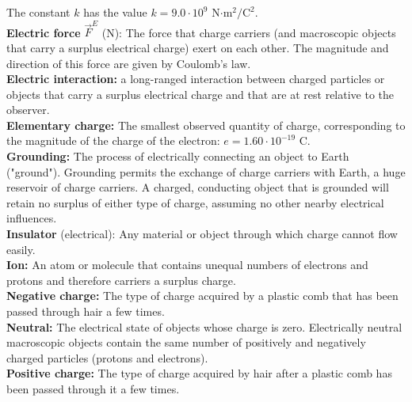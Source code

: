         The constant $k$ has the value $k=9.0\cdot 10^9$ N$\cdot\text{m}^2/\text{C}^2$. \\
        \textbf{Electric force} $\vec{F}^E$ (N): The force that charge carriers (and macroscopic objects that carry a surplus electrical charge) exert on each other. The magnitude and direction of this force are given
        by Coulomb's law. \\
        \textbf{Electric interaction:} a long-ranged interaction between charged particles or objects that carry a surplus electrical charge and that are at rest relative to the observer. \\
        \textbf{Elementary charge:} The smallest observed quantity of charge, corresponding to the magnitude of the charge of the electron: $e = 1.60\cdot 10^{-19}$ C. \\
        \textbf{Grounding:} The process of electrically connecting an object to Earth ("ground"). Grounding permits the exchange of charge carriers with Earth, a huge reservoir of charge carriers. A charged, conducting
        object that is grounded will retain no surplus of either type of charge, assuming no other nearby electrical influences. \\
        \textbf{Insulator} (electrical): Any material or object through which charge cannot flow easily. \\
        \textbf{Ion:} An atom or molecule that contains unequal numbers of electrons and protons and therefore carriers a surplus charge. \\
        \textbf{Negative charge:} The type of charge acquired by a plastic comb that has been passed through hair a few times. \\
        \textbf{Neutral:} The electrical state of objects whose charge is zero. Electrically neutral macroscopic objects contain the same number of positively and negatively charged particles (protons and electrons). \\
        \textbf{Positive charge:} The type of charge acquired by hair after a plastic comb has been passed through it a few times.